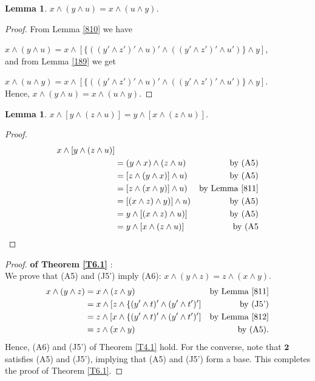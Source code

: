 \documentclass{amsart}
\theoremstyle{plain}
\newtheorem{lemma}[theorem]{Lemma}
\theoremstyle{problem}
\theoremstyle{definition}
\theoremstyle{remark}
\numberwithin{equation}{section}
\begin{document}
\begin{lemma} \label{811} 
    $x \land (y \land u) = x \land (u \land y)$.
\end{lemma}



\begin{proof}
From Lemma  \ref{810} we have  

$x \land (y \land u) = x \land [\{((y' \land z')' \land u)' \land ((y' \land z')' \land u')\} \land y]  $, \\
and from Lemma  \ref{189} we get 

$x \land (u \land y) = x \land [\{((y' \land z')' \land u)' \land ((y' \land z')' \land u')\} \land y]  $. \\
Hence,
 $x \land (y \land u) = x \land (u \land y)$. 
 \end{proof}

\begin{lemma} \label{812}
    $x \land [y \land (z \land u)] =  y \land [x \land (z \land u)]$.
\end{lemma}
\begin{proof}
\begin{align*}
    x \land [y \land (z \land u)]\\
            &= (y \land x) \land (z \land u) &\text{by (A5)}\\
            &= [z \land (y \land x)] \land u) &\text{by (A5)}\\
            &= [z \land (x \land y)] \land u) &\text{by Lemma \ref{811}}\\          
            &= [(x \land z) \land y)] \land u) &\text{by (A5)}\\
            &= y \land [(x \land z) \land u)]  &\text{by (A5)}\\
            &= y \land [x \land (z \land u)]  &\text{by (A5}
\end{align*}
\end{proof}

\begin{proof} {\bf of Theorem \ref{T6.1}} :\\
We prove that (A5) and (J5') imply (A6):
    $x \land (y \land z) = z \land (x \land y)$.
\begin{align*}
    x \land (y \land z)
          &= x \land (z \land y) &\text{by Lemma \ref{811}} \\   
          &= x \land [z \land \{(y' \land t)' \land (y' \land t')']  &\text{by (J5')} \\ 
          &= z \land [x \land \{(y' \land t)' \land (y' \land t')'] &\text{by Lemma \ref{812}}\\    
          &= z \land (x \land y)  &\text{by (A5)}.  
\end{align*}
 Hence, (A6) and (J5') of Theorem \ref{T4.1} hold.  For the converse, note that $\mathbf{2}$ satisfies (A5) and (J5'),
 implying that (A5) and (J5') form a base.  This completes the proof of Theorem \ref{T6.1}.
\end{proof}
\end{document}
